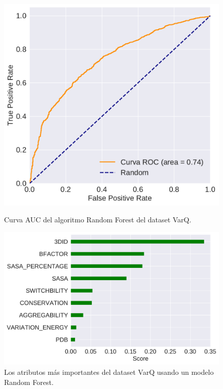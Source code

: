\begin{figure}
\centering

\begin{minipage}[b]{0.8\textwidth}
    \includegraphics[width=\textwidth]{documents/latex/figures/3/auc_varq.pdf}
    \caption{Curva AUC del algoritmo Random Forest del dataset VarQ.}
    \label{fig:auc_varq}
\end{minipage}

\hfill
\hfill

\begin{minipage}[b]{\textwidth}
    \includegraphics[width=\textwidth]{documents/latex/figures/3/importances_varq.pdf}
    \caption{Los atributos más importantes del dataset VarQ usando un modelo Random Forest.}
    \label{fig:importance_varq}
\end{minipage}

\end{figure}


